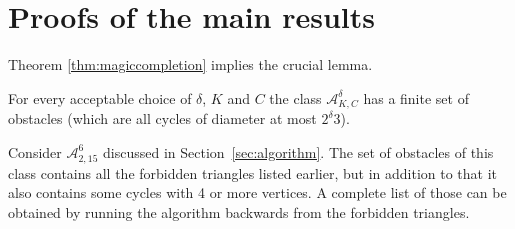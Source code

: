 \documentclass[11pt]{amsart}
\begin{document}
\section{Proofs of the main results}
Theorem \ref{thm:magiccompletion} implies the crucial lemma.
\begin{lemma}
\label{lem:obstacles}
For every acceptable choice of $\delta$, $K$ and $C$ the class $\mathcal A^\delta_{K,C}$ has a finite set of obstacles (which are all cycles of diameter at most $2^\delta 3$).
\end{lemma}

\begin{example}\rm
Consider $\mathcal A^6_{2,15}$ discussed in Section~\ref{sec:algorithm}.
The set of obstacles of this class contains all the forbidden triangles listed
earlier, but in addition to that it also contains some cycles with 4 or more vertices. A complete
list of those can be obtained by running the algorithm backwards from the forbidden
triangles.


\end{example}
\end{document}
